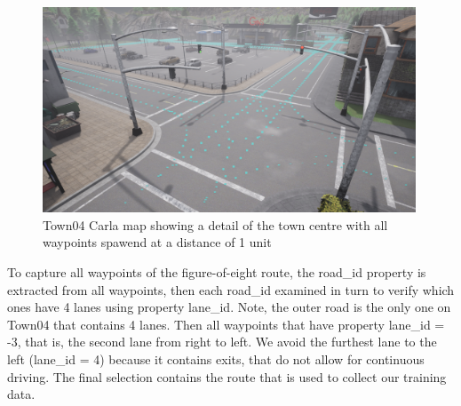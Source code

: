 
\begin{figure}[h]
    \centering
    \includegraphics[width=0.99\textwidth]{Figures/Methods/Town04Waypoints.png}
    \caption{Town04 Carla map showing a detail of the town centre with all waypoints spawend at a distance of 1 unit}
    \label{fig:Town04Waypoints}
\end{figure}

To capture all waypoints of the figure-of-eight route, the road\_id property is extracted from all waypoints, then each road\_id examined in turn to verify which ones have 4 lanes using property lane\_id. Note, the outer road is the only one on Town04 that contains 4 lanes. Then all waypoints that have property lane\_id = -3, that is, the second lane from right to left. We avoid the furthest lane to the left (lane\_id = 4) because it contains exits, that do not allow for continuous driving. The final selection contains the route that is used to collect our training data.

